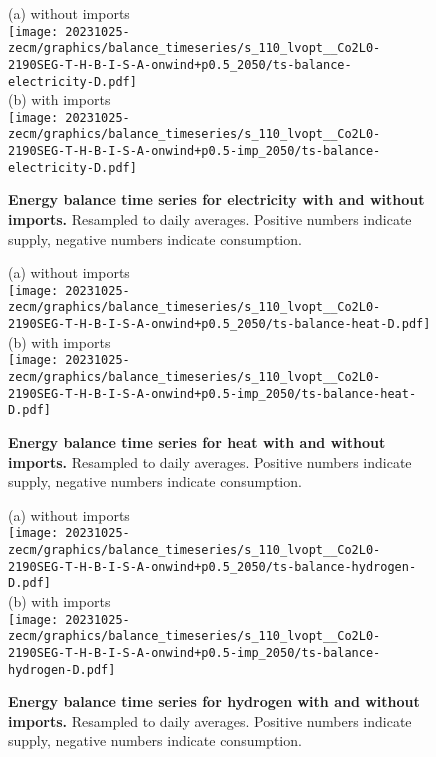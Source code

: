 \begin{figure*}
    \centering
    \footnotesize
    (a) without imports \\
    \texttt{[image: 20231025-zecm/graphics/balance\_timeseries/s\_110\_lvopt\_\_Co2L0-2190SEG-T-H-B-I-S-A-onwind+p0.5\_2050/ts-balance-electricity-D.pdf]} \\
    (b) with imports \\
    \texttt{[image: 20231025-zecm/graphics/balance\_timeseries/s\_110\_lvopt\_\_Co2L0-2190SEG-T-H-B-I-S-A-onwind+p0.5-imp\_2050/ts-balance-electricity-D.pdf]}
    \caption{\textbf{Energy balance time series for electricity with and without imports.} Resampled to daily averages. Positive numbers indicate supply, negative numbers indicate consumption.}
    \label{fig:si:balance-elec}
\end{figure*}

\begin{figure*}
    \centering
    \footnotesize
    (a) without imports \\
    \texttt{[image: 20231025-zecm/graphics/balance\_timeseries/s\_110\_lvopt\_\_Co2L0-2190SEG-T-H-B-I-S-A-onwind+p0.5\_2050/ts-balance-heat-D.pdf]} \\
    (b) with imports \\
    \texttt{[image: 20231025-zecm/graphics/balance\_timeseries/s\_110\_lvopt\_\_Co2L0-2190SEG-T-H-B-I-S-A-onwind+p0.5-imp\_2050/ts-balance-heat-D.pdf]}
    \caption{\textbf{Energy balance time series for heat with and without imports.} Resampled to daily averages. Positive numbers indicate supply, negative numbers indicate consumption.}
    \label{fig:si:balance-heat}
\end{figure*}

\begin{figure*}
    \centering
    \footnotesize
    (a) without imports \\
    \texttt{[image: 20231025-zecm/graphics/balance\_timeseries/s\_110\_lvopt\_\_Co2L0-2190SEG-T-H-B-I-S-A-onwind+p0.5\_2050/ts-balance-hydrogen-D.pdf]} \\
    (b) with imports \\
    \texttt{[image: 20231025-zecm/graphics/balance\_timeseries/s\_110\_lvopt\_\_Co2L0-2190SEG-T-H-B-I-S-A-onwind+p0.5-imp\_2050/ts-balance-hydrogen-D.pdf]}
    \caption{\textbf{Energy balance time series for hydrogen with and without imports.} Resampled to daily averages. Positive numbers indicate supply, negative numbers indicate consumption.}
    \label{fig:si:balance-h2}
\end{figure*}

